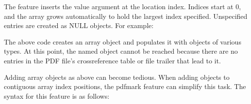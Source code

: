 \documentclass[letterpaper,12pt,english,openany,oneside]{sphinxmanual}
\begin{document}
\begin{sphinxVerbatim}[commandchars=\\\{\}]
 \PYG{p}{[}   
 
  
\end{sphinxVerbatim}

The  feature inserts the value argument at the location index. Indices start at 0, and the array grows automatically to hold the largest index specified. Unspecified entries are created as NULL objects. For example:

\begin{sphinxVerbatim}[commandchars=\\\{\}]
\PYG{p}{[}      
\PYG{p}{[}       
\PYG{p}{[}     
\PYG{p}{[}     
\end{sphinxVerbatim}

The above code creates an array object and populates it with objects of various types. At this point, the named object cannot be reached because there are no entries in the PDF file’s cross\sphinxhyphen{}reference table or file trailer that lead to it.

Adding array objects as above can become tedious. When adding objects to contiguous array index positions, the pdfmark feature  can simplify this task. The syntax for this feature is as follows:

\begin{sphinxVerbatim}[commandchars=\\\{\}]
 \PYG{p}{[} 
 \PYG{p}{[}

  
\PYG{p}{]}  
\end{sphinxVerbatim}
\end{document}
